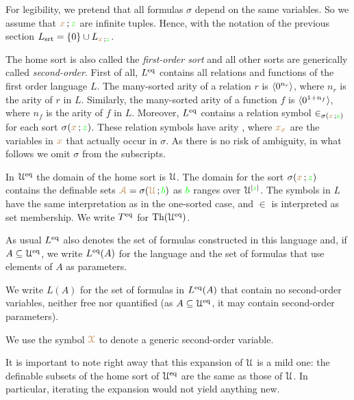 \documentclass[creche.tex]{subfiles}
\begin{document}
For legibility, we pretend that all formulas $\sigma$ depend on the same variables. 
So we assume that ${\color{brown} x}\,;{\color{green} z}$ are infinite tuples.
Hence, with the notation of the previous section $L_{\rm srt}=\{0\}\cup L_{{\color{brown} x}\,;{\color{green} z}}$.

The home sort is also called the \emph{first-order sort\/} and
all other sorts are generically called \emph{second-order}.
First of all, $L^{{\rm eq}}$ contains all relations and functions of the first order language $L$.
The many-sorted arity of a relation $r$ is $\langle0^{n_r}\rangle$, where $n_r$ is the arity of $r$ in $L$.
Similarly, the many-sorted arity of a function $f$ is $\langle0^{1+n_f}\rangle$, where $n_f$ is the arity of $f$ in $L$.
Moreover, $L^{{\rm eq}}$ contains a relation symbol $\in_{\sigma({\color{brown} x}\,;{\color{green} z})}$ for each sort $\sigma({\color{brown} x}\,;{\color{green} z})$.
These relation symbols have arity , where ${\color{brown} x_\sigma}$ are the variables in ${\color{brown} x}$ that actually occur in $\sigma$. 
As there is no risk of ambiguity, in what follows we omit $\sigma$ from the subscripts.

In \emph{$\EuScript U^{{{\rm eq}}}$\/} the domain of the home sort is $\EuScript U$.
The domain for the sort $\sigma({\color{brown} x}\,;{\color{green} z})$ contains 
the definable sets ${\color{brown}\EuScript A}=\sigma({\color{brown}\EuScript U}\,;{\color{green} b})$ as ${\color{green} b}$ ranges over $\EuScript U^{|{\color{green} z}|}$.
The symbols in $L$ have the same interpretation as in the one-sorted case, and $\in$ is interpreted as set membership.
We write \emph{$T^{{{\rm eq}}}$\/} for $\textrm{Th}(\EuScript U^{{\rm eq}})$.

As usual \emph{$L^{{\rm eq}}$\/} also denotes the set of formulas constructed in this language and, if $A\subseteq\EuScript U^{{\rm eq}}$, we write  \emph{$L^{{\rm eq}}(A)$\/} for the language and the set of formulas that use elements of $A$ as parameters.

\noindent\llap{\textcolor{red}{\Large\danger}\kern1.5ex}We write \emph{$L(A)$\/} for the set of formulas in $L^{{\rm eq}}(A)$ that contain no second-order variables, neither free nor quantified (as $A\subseteq\EuScript U^{{\rm eq}}$, it may contain second-order parameters).

We use the symbol ${\color{brown}\EuScript X}$ to denote a generic second-order variable.


It is important to note right away that this expansion of $\EuScript U$ is a mild one: the definable subsets of the home sort of $\EuScript U^{{\rm eq}}$ are the same as those of $\EuScript U$.
In particular, iterating the expansion would not yield anything new.
\end{document}
